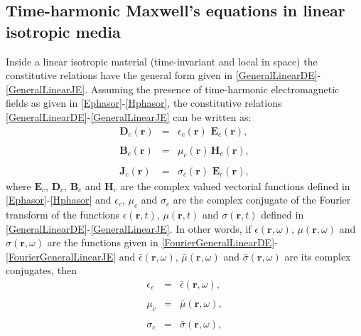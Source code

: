 \subsection{Time-harmonic Maxwell's equations in linear isotropic media}\label{MaxwellFD-LIM}

Inside a linear isotropic material (time-invariant and local in space) the constitutive relations have the general form given in \eqref{GeneralLinearDE}-\eqref{GeneralLinearJE}. Assuming the presence of time-harmonic electromagnetic fields as given in \eqref{Ephasor}-\eqref{Hphasor}, the constitutive relations \eqref{GeneralLinearDE}-\eqref{GeneralLinearJE} can be written as:
\begin{eqnarray}
    \mathbf{D}_{c}\left(\mathbf{r}\right) &=& \epsilon_{c}\left(\mathbf{r}\right)\,\, \mathbf{E}_{c}\left(\mathbf{r}\right), \label{ConstitutiveRelationDELFD}
	\\\nonumber
	\\[-1em]
	\mathbf{B}_{c}\left(\mathbf{r}\right) &=& \mu_{c}\left(\mathbf{r}\right)\, \mathbf{H}_{c}\left(\mathbf{r}\right),\label{ConstitutiveRelationBHLFD}
	\\\nonumber
	\\[-1em]
	\mathbf{J}_{c}\left(\mathbf{r}\right) &=& \sigma_{c}\left(\mathbf{r}\right)\,\, \mathbf{E}_{c}\left(\mathbf{r}\right),\label{ConstitutiveRelationJELFD}
\end{eqnarray}
where $\mathbf{E}_{c}$, $\mathbf{D}_{c}$, $\mathbf{B}_{c}$ and $\mathbf{H}_{c}$ are the complex valued vectorial functions defined in \eqref{Ephasor}-\eqref{Hphasor} and $\epsilon_{c}$, $\mu_{c}$ and $\sigma_{c}$ are the complex conjugate of the Fourier transform of the functions $\epsilon(\mathbf{r}, t)$, $\mu(\mathbf{r}, t)$ and $\sigma(\mathbf{r}, t)$ defined in \eqref{GeneralLinearDE}-\eqref{GeneralLinearJE}. In other words, if $\epsilon(\mathbf{r}, \omega)$, $\mu(\mathbf{r}, \omega)$ and $\sigma(\mathbf{r}, \omega)$ are the functions given in \eqref{FourierGeneralLinearDE}-\eqref{FourierGeneralLinearJE} and $\bar{\epsilon}(\mathbf{r}, \omega)$, $\bar{\mu}(\mathbf{r}, \omega)$ and $\bar{\sigma}(\mathbf{r}, \omega)$ are its complex
conjugates, then 
\begin{eqnarray}
    \epsilon_{c} &=& \bar{\epsilon}(\mathbf{r},\omega),\label{ExplainingFTEp}
	\\\nonumber
	\\[-1em]
	\mu_{c} &=& \bar{\mu}(\mathbf{r},\omega),\label{ExplainingFTMu}
	\\\nonumber
	\\[-1em]
	\sigma_{c} &=& \bar{\sigma}(\mathbf{r},\omega),\label{ExplainingFTSig}
\end{eqnarray}
